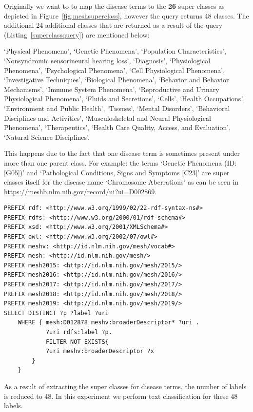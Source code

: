 Originally we want to to map the disease terms to the \textbf{26} super classes as depicted in Figure~\ref{fig:meshsuperclass}, however the query returns 48 classes. 
The additional 24 additional classes that are returned as a result of the query (Listing~\ref{superclassquery}) are mentioned below:
\begin{spverbatim}
`Physical Phenomena', `Genetic Phenomena', `Population Characteristics', `Nonsyndromic sensorineural hearing loss', `Diagnosis', `Physiological Phenomena', `Psychological Phenomena', `Cell Physiological Phenomena', `Investigative Techniques', `Biological Phenomena', `Behavior and Behavior Mechanisms', `Immune System Phenomena', `Reproductive and Urinary Physiological Phenomena', `Fluids and Secretions', `Cells', `Health Occupations', `Environment and Public Health', `Tissues', `Mental Disorders', `Behavioral Disciplines and Activities', `Musculoskeletal and Neural Physiological Phenomena', `Therapeutics', `Health Care Quality, Access, and Evaluation', `Natural Science Disciplines'. 
\end{spverbatim}
This happens due to the fact that one disease term is sometimes present under more than one parent class. 
For example: the terms `Genetic Phenomena (ID: [G05])' and `Pathological Conditions, Signs and Symptoms [C23]' are super classes itself for the disease name `Chromosome Aberrations' as can be seen in \url{https://meshb.nlm.nih.gov/record/ui?ui=D002869}. 
\begin{lstlisting}[caption = SPARQL query to map \emph{one} disease name to the respective super class using the MeSH RDF endpoint, label = superclassquery]
PREFIX rdf: <http://www.w3.org/1999/02/22-rdf-syntax-ns#>
PREFIX rdfs: <http://www.w3.org/2000/01/rdf-schema#>
PREFIX xsd: <http://www.w3.org/2001/XMLSchema#>
PREFIX owl: <http://www.w3.org/2002/07/owl#>
PREFIX meshv: <http://id.nlm.nih.gov/mesh/vocab#>
PREFIX mesh: <http://id.nlm.nih.gov/mesh/>
PREFIX mesh2015: <http://id.nlm.nih.gov/mesh/2015/>
PREFIX mesh2016: <http://id.nlm.nih.gov/mesh/2016/>
PREFIX mesh2017: <http://id.nlm.nih.gov/mesh/2017/>
PREFIX mesh2018: <http://id.nlm.nih.gov/mesh/2018/>
PREFIX mesh2019: <http://id.nlm.nih.gov/mesh/2019/>
SELECT DISTINCT ?p ?label ?uri 
    WHERE { mesh:D012878 meshv:broaderDescriptor* ?uri .
            ?uri rdfs:label ?p.
            FILTER NOT EXISTS{
            ?uri meshv:broaderDescriptor ?x
        }
    }
\end{lstlisting}
As a result of extracting the super classes for disease terms, the number of labels is reduced to 48. In this experiment we perform text classification for these 48 labels.

